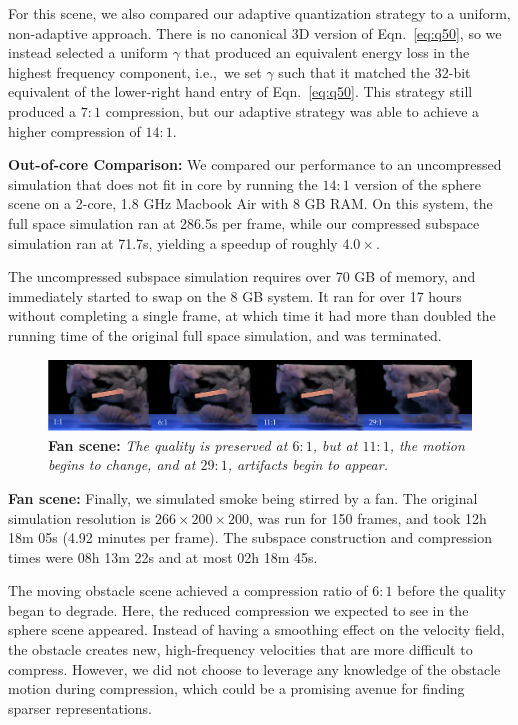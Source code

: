 For this scene, we also compared our adaptive quantization strategy to a uniform, non-adaptive approach. There is no canonical 3D version of Eqn.~\ref{eq:q50}, so we instead selected a uniform $\gamma$ that produced an equivalent energy loss in the highest frequency component, i.e.,~we set $\gamma$ such that it matched the 32-bit equivalent of the lower-right hand entry of Eqn.~\ref{eq:q50}. This strategy still produced a $7:1$ compression, but our adaptive strategy was able to achieve a higher compression of $14:1$.

\noindent \textbf{Out-of-core Comparison:} We compared our performance to an uncompressed simulation that does not fit in core by running the $14 : 1$ version of the sphere scene on a 2-core, 1.8 GHz Macbook Air with 8 GB RAM. On this system, the full space simulation ran at 286.5s per frame, while our compressed subspace simulation ran at 71.7s, yielding a speedup of roughly $4.0\times$.

The uncompressed subspace simulation requires over 70 GB of memory, and immediately started to swap on the 8 GB system. It ran for over 17 hours without completing a single frame, at which time it had more than doubled the running time of the original full space simulation, and was terminated.

\begin{figure}[t]
\includegraphics[width= \columnwidth]{chap4/figures/fan_sidebyside.png}
\caption{\textbf{Fan scene:} {\em The quality is preserved at $6:1$, but at $11:1$, the motion begins to change, and at $29:1$, artifacts begin to appear.}}
\label{fig:fanComparison}
\end{figure}
\noindent \textbf{Fan scene:} Finally, we simulated smoke being stirred by a fan. The original simulation resolution is $266 \times 200 \times 200$, was run for 150 frames, and took 12h 18m 05s (4.92 minutes per frame). The subspace construction and compression times were 08h 13m 22s and at most 02h 18m 45s.

The moving obstacle scene achieved a compression ratio of $6:1$ before the quality began to degrade. Here, the reduced compression we expected to see in the sphere scene appeared. Instead of having a smoothing effect on the velocity field, the obstacle creates new, high-frequency velocities that are more difficult to compress. However, we did not choose to leverage any knowledge of the obstacle motion during compression, which could be a promising avenue for finding sparser representations.

